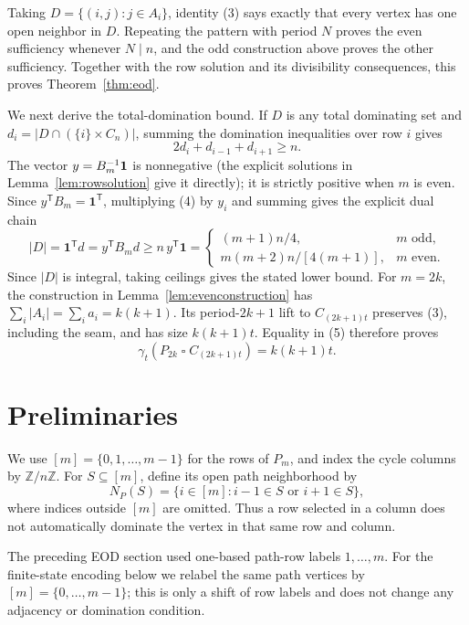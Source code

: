 \documentclass[11pt]{article}
\theoremstyle{definition}
\newcommand{\gt}{\gamma_t}
\newcommand{\sq}{\mathbin{\square}}
\begin{document}
Taking \(D=\{(i,j):j\in A_i\}\), identity (3) says exactly that every
vertex has one open neighbor in \(D\). Repeating the pattern with period
\(N\) proves the even sufficiency whenever \(N\mid n\), and the odd
construction above proves the other sufficiency. Together with the row
solution and its divisibility consequences, this proves
Theorem~\ref{thm:eod}.

We next derive the total-domination bound. If \(D\) is any total
dominating set and \(d_i=|D\cap(\{i\}\times C_n)|\), summing the
domination inequalities over row \(i\) gives
\[
2d_i+d_{i-1}+d_{i+1}\ge n.                                  \tag{4}
\]
The vector \(y=B_m^{-1}{\bf1}\) is nonnegative (the explicit solutions in
Lemma~\ref{lem:rowsolution} give it directly); it is strictly positive when
\(m\) is even. Since \(y^{\mathsf T}B_m=\mathbf1^{\mathsf T}\), multiplying
(4) by \(y_i\) and summing gives the explicit dual chain
\[
|D|=\mathbf1^{\mathsf T}d=y^{\mathsf T}B_md
\ge n\,y^{\mathsf T}\mathbf1
=\begin{cases}
(m+1)n/4,&m\text{ odd},\\
m(m+2)n/[4(m+1)],&m\text{ even}.
\end{cases}                                                   \tag{5}
\]
Since \(|D|\) is integral, taking ceilings gives the stated lower bound.
For \(m=2k\), the construction in Lemma~\ref{lem:evenconstruction}
has \(\sum_i|A_i|=\sum_i a_i=k(k+1)\). Its period-\(2k+1\) lift to
\(C_{(2k+1)t}\) preserves (3), including the seam, and has size
\(k(k+1)t\). Equality in (5) therefore proves
\[
\gt(P_{2k}\sq C_{(2k+1)t})=k(k+1)t.
\]

\section{Preliminaries}

We use \([m]=\{0,1,\ldots,m-1\}\) for the rows of \(P_m\), and index the
cycle columns by \(\mathbb{Z}/n\mathbb{Z}\). For \(S\subseteq[m]\), define its
open path neighborhood by
\[
N_P(S)=\{i\in[m]:i-1\in S\text{ or }i+1\in S\},
\]
where indices outside \([m]\) are omitted. Thus a row selected in a column
does not automatically dominate the vertex in that same row and column.

The preceding EOD section used one-based path-row labels
\(1,\ldots,m\). For the finite-state encoding below we relabel the same path
vertices by \([m]=\{0,\ldots,m-1\}\); this is only a shift of row labels and
does not change any adjacency or domination condition.
\end{document}
